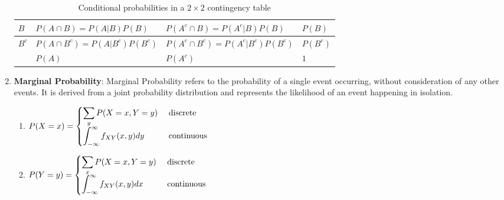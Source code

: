 \begin{enumerate}
\begin{customArrayStretch}{1.2}
\begin{table}[H]
\begin{tabular}{|l||l|l|l|}
                  $B$ & $P (A \cap B) = P (A|B) P (B)$ & $P (A^c \cap B) = P (A^c|B) P (B)$ & $P (B)$ \\
                  \hline

                  $B^c$ & $P (A \cap B^c) = P (A|B^c) P (B^c)$ & $P (A^c \cap B^c) = P (A^c|B^c) P (B^c)$ & $P (B^c)$ \\
                  \hline

                  & $P (A)$ & $P (A^c)$ & $1$ \\
                  \hline
            \end{tabular}
            \caption{Conditional probabilities in a $2 \times 2$ contingency table \cite{statistics/book/Statistics-for-Data-Scientists/Maurits-Kaptein}}
            \label{statistics/probability-theory/Conditional Probability/Conditional-probabilities-contingency-table}
        \end{table}
    \end{customArrayStretch}


    \item \textbf{Marginal Probability}: Marginal Probability refers to the probability of a single event occurring, without consideration of any other events.
    It is derived from a joint probability distribution and represents the likelihood of an event happening in isolation.
    \hfill \cite{geeksforgeeks/engineering-mathematics/marginal-probability}
    \begin{enumerate}
        \item
        $
            P(X=x) =
            \begin{cases}
                \displaystyle\sum_y P(X=x, Y=y) & \text{ discrete} \\[0.2cm]
                \displaystyle\int_{-\infty}^\infty f_{XY}(x,y)dy & \text{ continuous} \\
            \end{cases}
        $
        \hfill \cite{geeksforgeeks/engineering-mathematics/marginal-probability}

        \item
        $
            P(Y=y) =
            \begin{cases}
                \displaystyle\sum_x P(X=x, Y=y) & \text{ discrete} \\[0.2cm]
                \displaystyle\int_{-\infty}^\infty f_{XY}(x,y)dx & \text{ continuous} \\
            \end{cases}
        $
        \hfill \cite{geeksforgeeks/engineering-mathematics/marginal-probability}
    \end{enumerate}


\end{enumerate}
